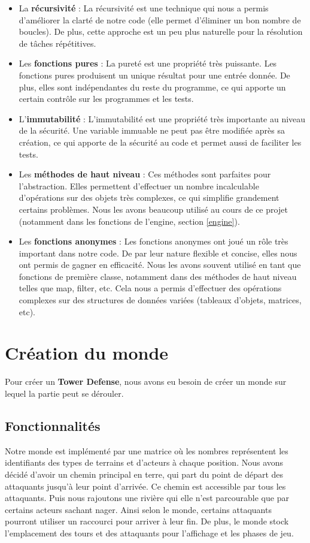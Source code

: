 \documentclass{article}
\begin{document}
\begin{itemize}
\item La \textbf{récursivité} : La récursivité est une technique qui nous a permis d'améliorer la clarté de notre code (elle permet d'éliminer un bon nombre de boucles). De plus, cette approche est un peu plus naturelle pour la résolution de tâches répétitives.
\item Les \textbf{fonctions pures} : La pureté est une propriété très puissante. Les fonctions pures produisent un unique résultat pour une entrée donnée. De plus, elles sont indépendantes du reste du programme, ce qui apporte un certain contrôle sur les programmes et les tests.
\item L'\textbf{immutabilité} : L'immutabilité est une propriété très importante au niveau de la sécurité. Une variable immuable ne peut pas être modifiée après sa création, ce qui apporte de la sécurité au code et permet aussi de faciliter les tests.
\item Les \textbf{méthodes de haut niveau} : Ces méthodes sont parfaites pour l'abstraction. Elles permettent d'effectuer un nombre incalculable d'opérations sur des objets très complexes, ce qui simplifie grandement certains problèmes. Nous les avons beaucoup utilisé au cours de ce projet (notamment dans les fonctions de l'engine, section \ref{engine}).

\item Les \textbf{fonctions anonymes} : Les fonctions anonymes ont joué un rôle très important dans notre code. De par leur nature flexible et concise, elles nous ont permis de gagner en efficacité. Nous les avons souvent utilisé en tant que fonctions de première classe, notamment dans des méthodes de haut niveau telles que map, filter, etc. Cela nous a permis d'effectuer des opérations complexes sur des structures de données variées (tableaux d'objets, matrices, etc).

\end{itemize}
    
\newpage
\section{Création du monde}
\label{world}
Pour créer un \textbf{Tower Defense}, nous avons eu besoin de créer un monde sur lequel la partie peut se dérouler.
\subsection{Fonctionnalités}
Notre monde est implémenté par une matrice où les nombres représentent les identifiants des types de terrains et d'acteurs à chaque position. Nous avons décidé d'avoir un chemin principal en terre, qui part du point de départ des attaquants jusqu'à leur point d'arrivée. Ce chemin est accessible par tous les attaquants. Puis nous rajoutons une rivière qui elle n'est parcourable que par certains acteurs sachant nager. Ainsi selon le monde, certains attaquants pourront utiliser un raccourci pour arriver à leur fin. De plus, le monde stock l'emplacement des tours et des attaquants pour l'affichage et les phases de jeu.
\end{document}
